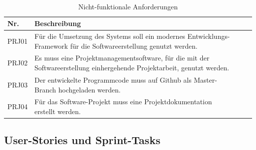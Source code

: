 \documentclass[a4paper, 11pt]{scrreprt}
\begin{document}
\begin{table}[H]

\caption{Nicht-funktionale Anforderungen}

\ \\

\par

\label{tab:Tabelle1}

\centering

\begin{tabular}{|p{2.5cm} p{12cm}| ll}

\hline
Nr. &	Beschreibung\\

\hline
PRJ01 &	Für die Umsetzung des Systems soll ein modernes Entwicklungs-Framework für die Softwareerstellung genutzt werden.\\

\hline
PRJ02 &	Es muss eine Projektmanagementsoftware, für die mit der Softwareerstellung einhergehende Projektarbeit, genutzt werden.\\

\hline
PRJ03 &	Der entwickelte Programmcode muss auf Github als Master-Branch hochgeladen werden.\\

\hline
PRJ04 &	Für das Software-Projekt muss eine Projektdokumentation erstellt werden.\\

\hline
\end{tabular}

\end{table}

\subsection{User-Stories und Sprint-Tasks}
\end{document}
